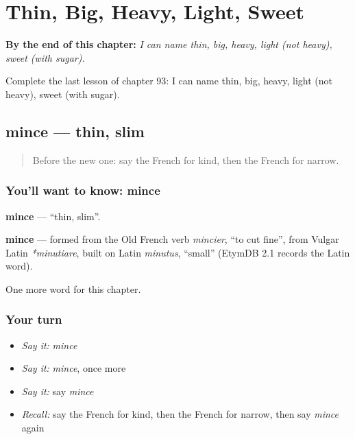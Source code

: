 
\chapter{Thin, Big, Heavy, Light, Sweet}
\label{ch:fr-thin-big-heavy-light-sweet}

\begin{chapteropening}
\textbf{By the end of this chapter:} \emph{I can name thin, big, heavy, light (not heavy), sweet (with sugar).}

Complete the last lesson of chapter 93: I can name thin, big, heavy, light (not heavy), sweet (with sugar).
\end{chapteropening}

\section[mince]{mince — thin, slim}

\label{lesson:FR-C93-mince}



\begin{quote}
Before the new one: say the French for kind, then the French for narrow.
\end{quote}

\subsection*{You'll want to know: mince}
\textbf{mince} — \textquotedblleft{}thin, slim\textquotedblright{}.

\begin{cousinweb}
\textbf{mince} — formed from the Old French verb \emph{mincier}, \textquotedblleft{}to cut fine\textquotedblright{}, from Vulgar Latin \emph{*minutiare}, built on Latin \emph{minutus}, \textquotedblleft{}small\textquotedblright{} (EtymDB 2.1 records the Latin word).
\end{cousinweb}

\begin{grammarlens}[title={What you've built}]
One more word for this chapter.
\end{grammarlens}

\subsection*{Your turn}
\begin{itemize}
\raggedright
  \item \emph{Say it:} \emph{mince}
  \item \emph{Say it:} \emph{mince}, once more
  \item \emph{Say it:} say \emph{mince}
  \item \emph{Recall:} say the French for kind, then the French for narrow, then say \emph{mince} again
\end{itemize}

